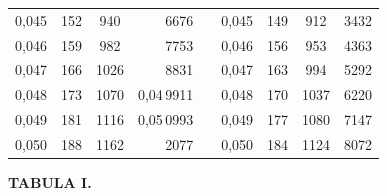 \begin{tabular}{|c|c|c|r|@{}p{9pt}@{}|c|c|c|r|}
0,045 & 152 & 940 & 6676 &  & 0,045 & 149 & 912 & 3432 \\[3pt]
0,046 & 159 & 982 & 7753 &  & 0,046 & 156 & 953 & 4363 \\
0,047 & 166 & 1026 & 8831 &  & 0,047 & 163 & 994 & 5292 \\
0,048 & 173 & 1070 & 0,04\,9911 &  & 0,048 & 170 & 1037 & 6220 \\
0,049 & 181 & 1116 & 0,05\,0993 &  & 0,049 & 177 & 1080 & 7147 \\
0,050 & 188 & 1162 & 2077 &  & 0,050 & 184 & 1124 & 8072 \\
\hline
\end{tabular}\par
\endgroup
\clearpage
{}
\begingroup
\centering
\fontsize{9}{9}\selectfont
\setlength{\tabcolsep}{6pt}
\renewcommand{\arraystretch}{1}
\setlength{\parskip}{0pt}
\textbf{TABULA I.}
\par\vspace{7pt}
